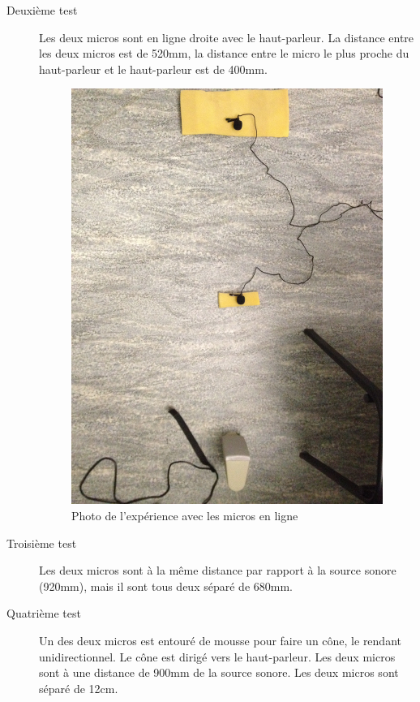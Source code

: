 \documentclass[12pt,a4paper]{report}
\begin{document}
\begin{description}
\begin{figure}[H]
	\end{figure}
\item[Deuxième test] Les deux micros sont en ligne droite avec le haut-parleur. La distance entre les deux micros est de 520mm, la distance entre le micro le plus proche du haut-parleur et le haut-parleur est de 400mm.
	\begin{figure}[H]
	\includegraphics[width=\textwidth]{../donnees11-03/test_2.jpg} 
	\caption{Photo de l'expérience avec les micros en ligne}
	\end{figure}
\item[Troisième test] Les deux micros sont à la même distance par rapport à la source sonore (920mm), mais il sont tous deux séparé de 680mm.
\item[Quatrième test] Un des deux micros est entouré de mousse pour faire un cône, le rendant unidirectionnel. Le cône est dirigé vers le haut-parleur. Les deux micros sont à une distance de 900mm de la source sonore. Les deux micros sont séparé de 12cm.

\end{description}
\end{document}
